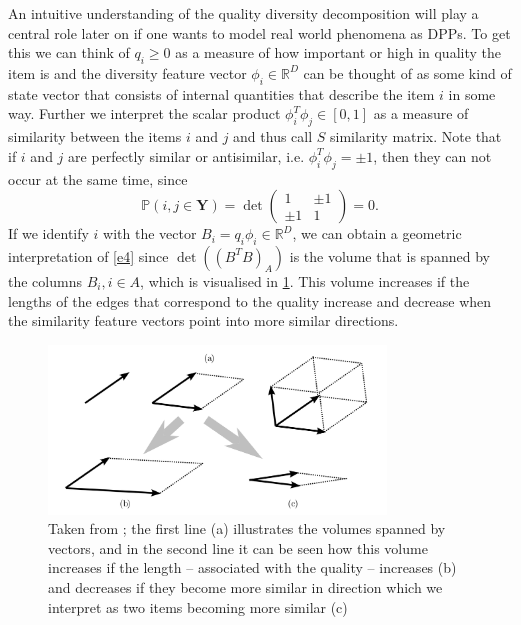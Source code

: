An intuitive understanding of the quality diversity decomposition will play a central role later on if one wants to model real world phenomena as DPPs. To get this %
 we can think of \(q_i\ge0\) as a measure of how important or high in quality the item is and the diversity feature vector \(\phi_i\in\mathbb R^D\) can be thought of as some kind of state vector that consists of internal quantities that describe the item \(i\) in some way. Further we interpret the scalar product \(\phi_i^T\phi_j\in[0,1]\) as a measure of similarity between the items \(i\) and \(j\) and thus call \(S\) similarity matrix. Note that if \(i\) and \(j\) are perfectly similar or antisimilar, i.e. \(\phi_i^T\phi_j=\pm1\), then they can not occur at the same time, since
\[\mathbb P(i,j\in\mathbf Y) = \det\begin{pmatrix} 1 & \pm1 \\ \pm1 & 1 \end{pmatrix} = 0. \]
If we identify \(i\) with the vector \(B_i=q_i\phi_i\in\mathbb R^D\), we can obtain a geometric interpretation of \eqref{e4} since \(\det((B^TB)_A)\) is the volume that is spanned by the columns \(B_i, i\in A\), which is visualised in \ref{fig:1}. This volume increases if the lengths of the edges that correspond to the quality increase and decrease when the similarity feature vectors point into more similar directions.

\vspace{2cm}
\begin{figure}[h!]
	\centering
	\includegraphics[width=0.8\textwidth]{qd-decomposition}
	\caption{Taken from \cite{kulesza2012determinantal}; the first line (a) illustrates the volumes spanned by vectors, and in the second line it can be seen how this volume increases if the length -- associated with the quality -- increases (b) and decreases if they become more similar in direction which we interpret as two items becoming more similar (c)}
	\label{fig:1}
\end{figure}

